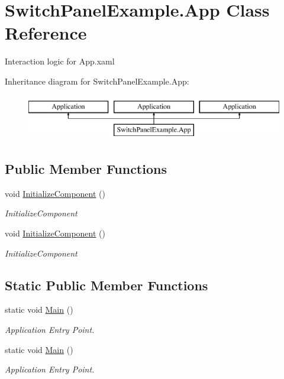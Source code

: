 \hypertarget{class_switch_panel_example_1_1_app}{}\section{Switch\+Panel\+Example.\+App Class Reference}
\label{class_switch_panel_example_1_1_app}


Interaction logic for App.\+xaml  


Inheritance diagram for Switch\+Panel\+Example.\+App\+:\begin{figure}[H]
\begin{center}
\leavevmode
\includegraphics[height=2.000000cm]{dc/df2/class_switch_panel_example_1_1_app}
\end{center}
\end{figure}
\subsection*{Public Member Functions}
\begin{DoxyCompactItemize}
\item 
void \mbox{\hyperlink{class_switch_panel_example_1_1_app_addade9d426808add3b2a910d2c51e2a4}{Initialize\+Component}} ()
\begin{DoxyCompactList}\small\item\em Initialize\+Component \end{DoxyCompactList}\item 
void \mbox{\hyperlink{class_switch_panel_example_1_1_app_addade9d426808add3b2a910d2c51e2a4}{Initialize\+Component}} ()
\begin{DoxyCompactList}\small\item\em Initialize\+Component \end{DoxyCompactList}\end{DoxyCompactItemize}
\subsection*{Static Public Member Functions}
\begin{DoxyCompactItemize}
\item 
static void \mbox{\hyperlink{class_switch_panel_example_1_1_app_a562447ab2fb7c5cc3d22577b49dd93fd}{Main}} ()
\begin{DoxyCompactList}\small\item\em Application Entry Point. \end{DoxyCompactList}\item 
static void \mbox{\hyperlink{class_switch_panel_example_1_1_app_a562447ab2fb7c5cc3d22577b49dd93fd}{Main}} ()
\begin{DoxyCompactList}\small\item\em Application Entry Point. \end{DoxyCompactList}\end{DoxyCompactItemize}


